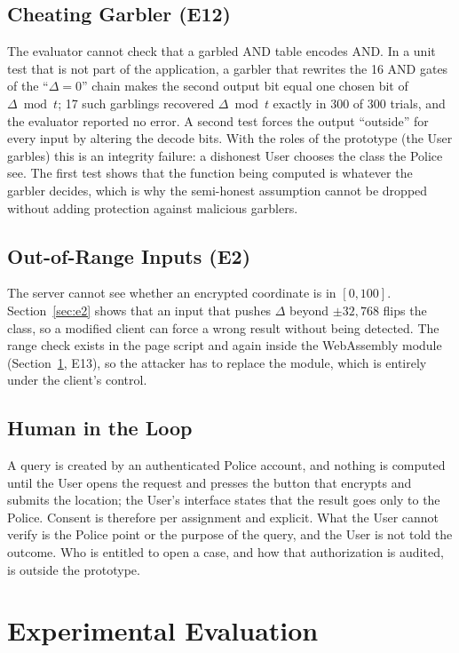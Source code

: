 \documentclass[conference,letterpaper]{IEEEtran}
\begin{document}
\subsection{Cheating Garbler (E12)}
The evaluator cannot check that a garbled AND table encodes AND. In a unit test that is not part of the application, a garbler that rewrites the 16 AND gates of the ``$\Delta = 0$'' chain makes the second output bit equal one chosen bit of $\Delta \bmod t$; 17 such garblings recovered $\Delta \bmod t$ exactly in 300 of 300 trials, and the evaluator reported no error. A second test forces the output ``outside'' for every input by altering the decode bits. With the roles of the prototype (the User garbles) this is an integrity failure: a dishonest User chooses the class the Police see. The first test shows that the function being computed is whatever the garbler decides, which is why the semi-honest assumption cannot be dropped without adding protection against malicious garblers.

\subsection{Out-of-Range Inputs (E2)}
The server cannot see whether an encrypted coordinate is in $[0, 100]$. Section~\ref{sec:e2} shows that an input that pushes $\Delta$ beyond $\pm 32{,}768$ flips the class, so a modified client can force a wrong result without being detected. The range check exists in the page script and again inside the WebAssembly module (Section~\ref{sec:eval}, E13), so the attacker has to replace the module, which is entirely under the client's control.

\subsection{Human in the Loop}
A query is created by an authenticated Police account, and nothing is computed until the User opens the request and presses the button that encrypts and submits the location; the User's interface states that the result goes only to the Police. Consent is therefore per assignment and explicit. What the User cannot verify is the Police point or the purpose of the query, and the User is not told the outcome. Who is entitled to open a case, and how that authorization is audited, is outside the prototype.

\section{Experimental Evaluation}
\label{sec:eval}
\end{document}
